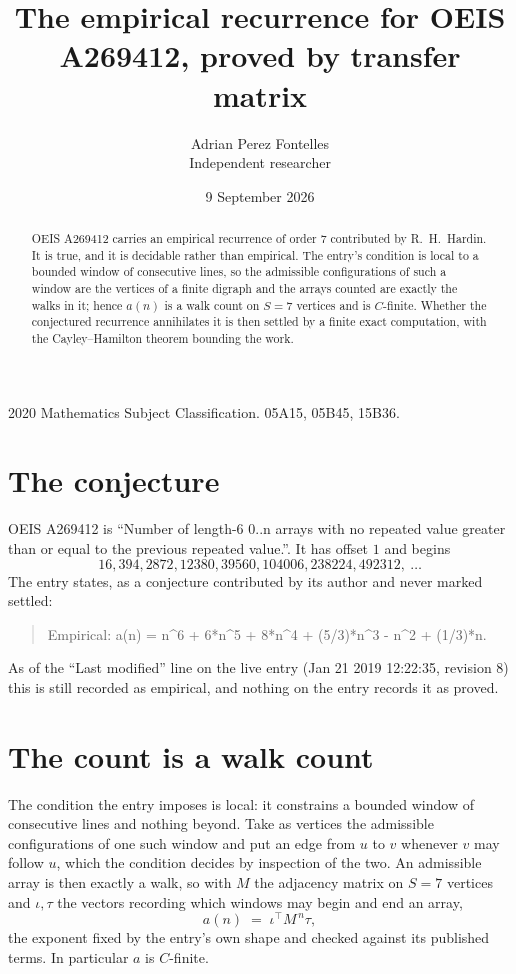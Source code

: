 \documentclass[11pt,a4paper]{article}
\title{The empirical recurrence for OEIS A269412, proved by transfer matrix}
\author{Adrian Perez Fontelles\\ \small Independent researcher}
\date{9 September 2026}
\theoremstyle{plain}
\theoremstyle{definition}
\begin{document}
\maketitle

\begin{abstract}
OEIS A269412 carries an empirical recurrence of order $7$ contributed by R.~H.~Hardin. It is
true, and it is decidable rather than empirical. The entry's condition is local to a bounded window of consecutive lines, so
the admissible configurations of such a window are the vertices of a finite digraph and the
arrays counted are exactly the walks in it; hence $a(n)$ is a walk count on $S=7$ vertices
and is $C$-finite. Whether the conjectured recurrence annihilates it is then settled by a
finite exact computation, with the Cayley--Hamilton theorem bounding the work.
\end{abstract}

\noindent\small 2020 Mathematics Subject Classification. 05A15, 05B45, 15B36.\normalsize

\section{The conjecture}

OEIS A269412 is ``Number of length-6 0..n arrays with no repeated value greater than or equal to the previous repeated value.''. It has offset $1$ and begins
\[
16, 394, 2872, 12380, 39560, 104006, 238224, 492312,\ \dots
\]
The entry states, as a conjecture contributed by its author and never marked settled:
\begin{quote}
Empirical: a(n) = n\^{}6 + 6*n\^{}5 + 8*n\^{}4 + (5/3)*n\^{}3 - n\^{}2 + (1/3)*n.
\end{quote}
As of the ``Last modified'' line on the live entry (Jan 21 2019 12:22:35, revision 8) this is still
recorded as empirical, and nothing on the entry records it as proved.

\section{The count is a walk count}

The condition the entry imposes is local: it constrains a bounded window of consecutive lines and nothing beyond. Take as
vertices the admissible configurations of one such window and put an edge from $u$ to $v$
whenever $v$ may follow $u$, which the condition decides by inspection of the two. An
admissible array is then exactly a walk, so with $M$ the adjacency matrix on $S=7$ vertices
and $\iota,\tau$ the vectors recording which windows may begin and end an array,
\[
a(n)\;=\;\iota^{\!\top}M^{\,n}\tau ,
\]
the exponent fixed by the entry's own shape and checked against its published terms. In
particular $a$ is $C$-finite.
\end{document}
